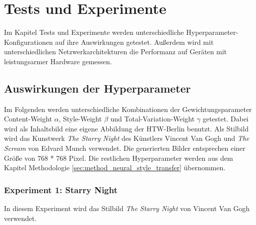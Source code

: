 \chapter{Tests und Experimente}
\label{cha:tests}

Im Kapitel Tests und Experimente werden unterschiedliche Hyperparameter-Konfigurationen auf ihre Auswirkungen getestet. Außerdem wird mit unterschiedlichen Netzwerkarchitekturen die Performanz auf Geräten mit leistungsarmer Hardware gemessen.

\section{Auswirkungen der Hyperparameter}

Im Folgenden werden unterschiedliche Kombinationen der Gewichtungsparameter Content-Weight $ \alpha $, Style-Weight $ \beta $ und Total-Variation-Weight $ \gamma $ getestet. Dabei wird als Inhaltsbild  eine eigene Abbildung der HTW-Berlin benutzt. Als Stilbild wird das Kunstwerk \textit{The Starry Night} des Künstlers Vincent Van Gogh und \textit{The Scream} von Edvard Munch verwendet. Die generierten Bilder entsprechen einer Größe von 768 * 768 Pixel. Die restlichen Hyperparameter werden aus dem Kapitel Methodologie \ref{sec:method_neural_style_transfer} übernommen.

\pagebreak

\subsection{Experiment 1: Starry Night}

In diesem Experiment wird das Stilbild \textit{The Starry Night} von Vincent Van Gogh verwendet.


